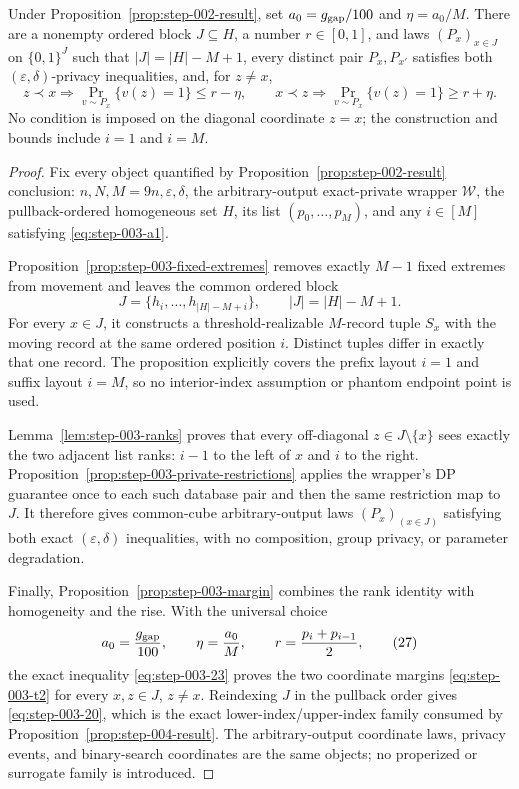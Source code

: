 \begin{proposition}
\label{prop:step-003-result}
Under Proposition~\ref{prop:step-002-result}, set
$a_0=g_{\rm gap}/100$ and $\eta=a_0/M$.  There are a nonempty ordered
block $J\subseteq H$, a number $r\in[0,1]$, and laws
$(P_x)_{x\in J}$ on $\{0,1\}^J$ such that
$|J|=|H|-M+1$, every distinct pair $P_x,P_{x'}$ satisfies both
$(\varepsilon,\delta)$-privacy inequalities, and, for $z\neq x$,
\[
z\prec x\Longrightarrow\Pr_{v\sim P_x}\{v(z)=1\}\leq r-\eta,
\qquad
x\prec z\Longrightarrow\Pr_{v\sim P_x}\{v(z)=1\}\geq r+\eta.
\]
No condition is imposed on the diagonal coordinate $z=x$; the
construction and bounds include $i=1$ and $i=M$.
\end{proposition}
\begin{proof}

Fix every object quantified by Proposition~\ref{prop:step-002-result} conclusion: \(n,N,M=9n,\varepsilon,\delta\), the arbitrary-output exact-private wrapper \(\mathcal W\), the pullback-ordered homogeneous set \(H\), its list \((p_0,\ldots,p_M)\), and any \(i \in [M]\) satisfying \eqref{eq:step-003-a1}.

Proposition~\ref{prop:step-003-fixed-extremes} removes exactly \(M-1\) fixed extremes from movement and leaves the common ordered block
\[
J=\{h_i,\ldots,h_{|H|-M+i}\},
\qquad
|J|=|H|-M+1.
\tag{26}\label{eq:step-003-26}
\]
For every \(x \in J\), it constructs a threshold-realizable \(M\)-record tuple \(S_x\) with the moving record at the same ordered position \(i\). Distinct tuples differ in exactly that one record. The proposition explicitly covers the prefix layout \(i=1\) and suffix layout \(i=M\), so no interior-index assumption or phantom endpoint point is used.

Lemma~\ref{lem:step-003-ranks} proves that every off-diagonal \(z \in J\setminus\{x\}\) sees exactly the two adjacent list ranks: \(i-1\) to the left of \(x\) and \(i\) to the right. Proposition~\ref{prop:step-003-private-restrictions} applies the wrapper's DP guarantee once to each such database pair and then the same restriction map to \(J\). It therefore gives common-cube arbitrary-output laws \((P_x)_(x \in J)\) satisfying both exact \((\varepsilon,\delta)\) inequalities, with no composition, group privacy, or parameter degradation.

Finally, Proposition~\ref{prop:step-003-margin} combines the rank identity with homogeneity and the rise. With the universal choice
\[
a_0=\frac{g_{\rm gap}}{100},
\qquad
\eta=\frac{a_0}{M},
\qquad
r=\frac{p_i+p_{i-1}}2,
\tag{27}\label{eq:step-003-27}
\]
the exact inequality \eqref{eq:step-003-23} proves the two coordinate margins \eqref{eq:step-003-t2} for every \(x,z \in J\), \(z \ne  x\). Reindexing \(J\) in the pullback order gives \eqref{eq:step-003-20}, which is the exact lower-index/upper-index family consumed by Proposition~\ref{prop:step-004-result}. The arbitrary-output coordinate laws, privacy events, and binary-search coordinates are the same objects; no properized or surrogate family is introduced.


\end{proof}
